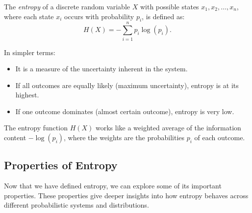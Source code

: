 \documentclass[12pt,a4paper]{article}
\newenvironment{defbox}[1][]{%
  \begin{tcolorbox}[enhanced, breakable, colback=defcolor, colframe=green!50!black, title=#1, fonttitle=\bfseries, arc=3pt, boxrule=0.5pt]
}{\end{tcolorbox}}
\begin{document}
\begin{defbox}[Entropy]
    The \emph{entropy} of a discrete random variable $X$ with possible states $x_1, x_2, \dots, x_n$, where each state $x_i$ occurs with probability $p_i$, is defined as:
    \[
    H(X) = - \sum_{i=1}^{n} p_i \log(p_i).
    \]
\end{defbox}

In simpler terms:

\begin{itemize}
    \item It is a measure of the uncertainty inherent in the system.
    \item If all outcomes are equally likely (maximum uncertainty), entropy is at its highest.
    \item If one outcome dominates (almost certain outcome), entropy is very low.
\end{itemize}

The entropy function $H(X)$ works like a weighted average of the information content $-\log(p_i)$, where the weights are the probabilities $p_i$ of each outcome.

\subsection{Properties of Entropy}

Now that we have defined entropy, we can explore some of its important properties. These properties give deeper insights into how entropy behaves across different probabilistic systems and distributions.
\end{document}

